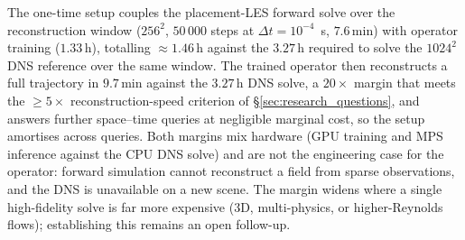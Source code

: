 The one-time setup couples the placement-LES forward solve over the reconstruction window ($256^2$, $50\,000$ steps at $\Delta t = 10^{-4}$~s, $7.6$\,min) with operator training ($1.33$\,h), totalling $\approx 1.46$\,h against the $3.27$\,h required to solve the $1024^2$ DNS reference over the same window. The trained operator then reconstructs a full trajectory in $9.7$\,min against the $3.27$\,h DNS solve, a $20\times$ margin that meets the $\ge 5\times$ reconstruction-speed criterion of \S\ref{sec:research_questions}, and answers further space--time queries at negligible marginal cost, so the setup amortises across queries. Both margins mix hardware (GPU training and MPS inference against the CPU DNS solve) and are not the engineering case for the operator: forward simulation cannot reconstruct a field from sparse observations, and the DNS is unavailable on a new scene. The margin widens where a single high-fidelity solve is far more expensive (3D, multi-physics, or higher-Reynolds flows); establishing this remains an open follow-up.

